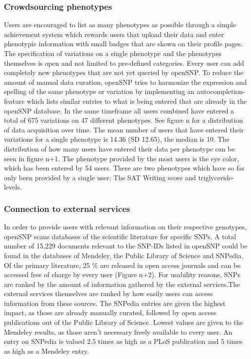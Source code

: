 \documentclass[10pt]{article}
\begin{document}
\subsubsection*{Crowdsourcing phenotypes}
Users are encouraged to list as many phenotypes as possible through a simple achievement system which rewards users that upload their data and enter phenotypic information with small badges that are shown on their profile pages. The specification of variations on a single phenotype and the phenotypes themselves is open and not limited to pre-defined categories. Every user can add completely new phenotypes that are not yet queried by openSNP. To reduce the amount of manual data curation, openSNP tries to harmonize the expression and spelling of the same phenotype or variation by implementing an autocompletion-feature which lists similar entries to what is being entered that are already in the openSNP database. In the same timeframe all users combined have entered a total of 675 variations on 47 different phenotypes. See figure n for a distribution of data acquisition over time.
The mean number of users that have entered their variations for a single phenotype is 14.36 (SD 12.65), the median is 10. The distribution of how many users have entered their data per phenotype can be seen in figure n+1. The phenotype provided by the most users is the eye color, which has been entered by 54 users. There are two phenotypes which have so far only been provided by a single user: The SAT Writing score and triglyceride-levels.
\subsubsection*{Connection to external services}
In order to provide users with relevant information on their respective genotypes, openSNP scans databases of the scientific literature for specific SNPs. A total number of 15,229 documents relevant to the SNP-IDs listed in openSNP could be found in the databases of Mendeley, the Public Library of Science and SNPedia. Of the primary literature, 25 \% are released in open access journals and can be accessed free of charge by every user (Figure n+2). For usability reasons, SNPs are ranked by the amount of information gathered by the external services.The external services themselves are ranked by how easily users can access information from these sources. The SNPedia entries are given the highest impact, as those are already manually curated, followed by open access publications out of the Public Library of Science. Lowest values are given to the Mendeley results, as those aren't necessary freely available to every user. An entry on SNPedia is valued 2.5 times as high as a PLoS publication and 5 times as high as a Mendeley entry.  
\end{document}
